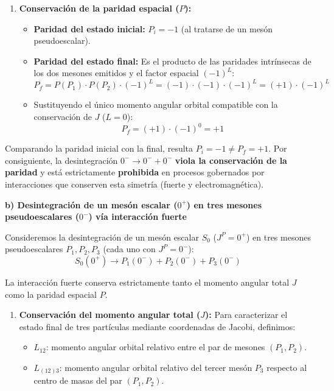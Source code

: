 \begin{problema}
\begin{enumerate}[label=\arabic*.]
    \item \textbf{Conservación de la paridad espacial ($P$):}
    \begin{itemize}
        \item \textbf{Paridad del estado inicial:} $P_i = -1$ (al tratarse de un mesón pseudoescalar).
        \item \textbf{Paridad del estado final:} Es el producto de las paridades intrínsecas de los dos mesones emitidos y el factor espacial $(-1)^L$:
        \begin{equation*}
            P_f = P(P_1) \cdot P(P_2) \cdot (-1)^L = (-1) \cdot (-1) \cdot (-1)^L = (+1) \cdot (-1)^L
        \end{equation*}
        \item Sustituyendo el único momento angular orbital compatible con la conservación de $J$ ($L = 0$):
        \begin{equation*}
            P_f = (+1) \cdot (-1)^0 = +1
        \end{equation*}
    \end{itemize}
\end{enumerate}

Comparando la paridad inicial con la final, resulta $P_i = -1 \neq P_f = +1$. Por consiguiente, la desintegración $0^- \to 0^- + 0^-$ \textbf{viola la conservación de la paridad} y está estrictamente \textbf{prohibida} en procesos gobernados por interacciones que conserven esta simetría (fuerte y electromagnética).

\vspace{0.3cm}
\textbf{b) Desintegración de un mesón escalar ($0^+$) en tres mesones pseudoescalares ($0^-$) vía interacción fuerte}

Consideremos la desintegración de un mesón escalar $S_0$ ($J^P = 0^+$) en tres mesones pseudoescalares $P_1, P_2, P_3$ (cada uno con $J^P = 0^-$):
\begin{equation*}
    S_0 (0^+) \longrightarrow P_1 (0^-) + P_2 (0^-) + P_3 (0^-)
\end{equation*}

La interacción fuerte conserva estrictamente tanto el momento angular total $J$ como la paridad espacial $P$.

\begin{enumerate}[label=\arabic*.]
    \item \textbf{Conservación del momento angular total ($J$):}
    Para caracterizar el estado final de tres partículas mediante coordenadas de Jacobi, definimos:
    \begin{itemize}
        \item $L_{12}$: momento angular orbital relativo entre el par de mesones $(P_1, P_2)$.
        \item $L_{(12)3}$: momento angular orbital relativo del tercer mesón $P_3$ respecto al centro de masas del par $(P_1, P_2)$.
    \end{itemize}


\end{enumerate}
\end{problema}
